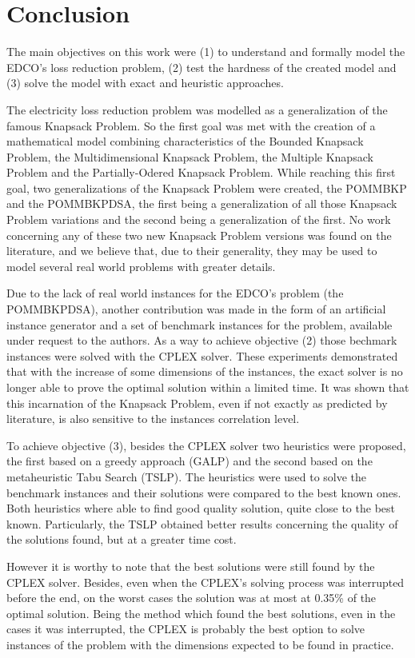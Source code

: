 \section{Conclusion}
\label{sec:conclu}

The main objectives on this work were (1) to understand and formally model the EDCO's loss reduction problem, (2) test the hardness
of the created model and (3) solve the model with exact and heuristic approaches.

The electricity loss reduction problem was modelled as a generalization of the famous Knapsack Problem. So the first goal was met
with the creation of a mathematical model combining characteristics of the Bounded Knapsack Problem, the Multidimensional Knapsack
Problem, the Multiple Knapsack Problem and the Partially-Odered Knapsack Problem. While reaching this first goal, two 
generalizations of the Knapsack Problem were created, the POMMBKP and the POMMBKPDSA, the first being a generalization of
all those Knapsack Problem variations and the second being a generalization of the first. No work concerning any of these two new 
Knapsack Problem versions was found on the literature, and we believe that, due to their generality, they may be used to model 
several real world problems with greater details.

Due to the lack of real world instances for the EDCO's problem (the POMMBKPDSA), another contribution was made in the form of an 
artificial instance generator and a set of benchmark instances for the problem, available under request to the authors. As a way to achieve objective (2)
those bechmark instances were solved with the CPLEX solver. These experiments demonstrated that with the increase of some dimensions
of the instances, the exact solver is no longer able to prove the optimal solution within a limited time. It was shown that this 
incarnation of the Knapsack Problem, even if not exactly as predicted by literature, is also sensitive to the instances correlation level.

To achieve objective (3), besides the CPLEX solver two heuristics were proposed, the first based on a greedy approach (GALP) and the second based 
on the metaheuristic Tabu Search (TSLP). The heuristics were used to solve the benchmark instances and their solutions were compared to the best
known ones. Both heuristics where able to find good quality solution, quite close to the best known. Particularly, the TSLP obtained better results
concerning the quality of the solutions found, but at a greater time cost.

However it is worthy to note that the best solutions were still found by the CPLEX solver. Besides, even when the CPLEX's solving 
process was interrupted before the end, on the worst cases the solution was at most at 0.35\% of the optimal solution. Being the method which
found the best solutions, even in the cases it was interrupted, the CPLEX is probably the best option 
to solve instances of the problem with the dimensions expected to be found in practice.
